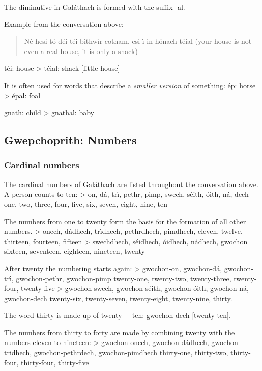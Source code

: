 The diminutive in Gal\'{a}thach is formed with the suffix -al.

Example from the conversation above:

\begin{quote}
N\'{e} hesi t\'{o} d\'{e}i t\'{e}i bithw\'{\i}r cotham, esi \'{\i} in h\'{o}nach t\'{e}ial (your house is not even a real house, it is only a shack)
\end{quote}

t\'{e}i: house
> t\'{e}ial: shack [little house]

It is often used for words that describe a \textit{smaller version} of something:
\'{e}p: horse
> \'{e}pal: foal

gnath: child
> gnathal: baby

\subsection{Gwepchoprith: Numbers}
\subsubsection{Cardinal numbers}

The cardinal numbers of Gal\'{a}thach are listed throughout the conversation above. A person counts to ten:
> on, d\'{a}, tr\'{\i}, pethr, pimp, swech, s\'{e}ith, \'{o}ith, n\'{a}, dech
one, two, three, four, five, six, seven, eight, nine, ten

The numbers from one to twenty form the basis for the formation of all other numbers.
> onech, d\'{a}dhech, tr\'{\i}dhech, pethrdhech, pimdhech,
eleven, twelve, thirteen, fourteen,  fifteen
> swechdhech, s\'{e}idhech, \'{o}idhech, n\'{a}dhech, gwochon
sixteen,  seventeen, eighteen, nineteen, twenty

After twenty the numbering starts again:
> gwochon-on, gwochon-d\'{a}, gwochon-tr\'{\i}, gwochon-pethr, gwochon-pimp
twenty-one, twenty-two, twenty-three, twenty-four, twenty-five
> gwochon-swech, gwochon-s\'{e}ith, gwochon-\'{o}ith, gwochon-n\'{a}, gwochon-dech
twenty-six, twenty-seven, twenty-eight, twenty-nine, thirty.

The word thirty is made up of twenty + ten: gwochon-dech [twenty-ten].

The numbers from thirty to forty are made by combining twenty with the numbers eleven to nineteen:
> gwochon-onech, gwochon-d\'{a}dhech, gwochon-tridhech, gwochon-pethrdech, gwochon-pimdhech
thirty-one, thirty-two, thirty-four, thirty-four, thirty-five

